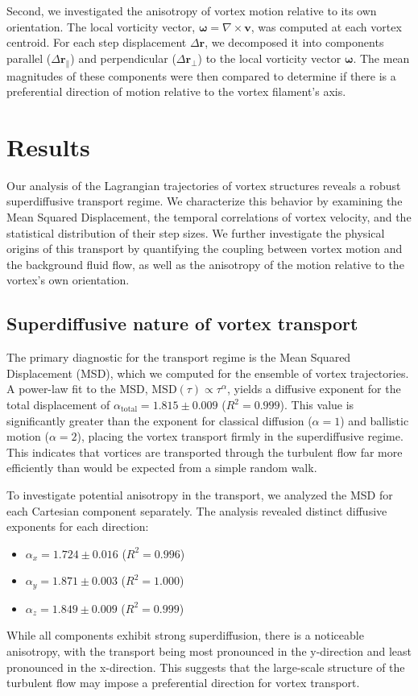 \documentclass[]{article}
\begin{document}
Second, we investigated the anisotropy of vortex motion relative to its own orientation. The local vorticity vector, $\boldsymbol{\omega} = \nabla \times \mathbf{v}$, was computed at each vortex centroid. For each step displacement $\Delta\mathbf{r}$, we decomposed it into components parallel ($\Delta\mathbf{r}_\parallel$) and perpendicular ($\Delta\mathbf{r}_\perp$) to the local vorticity vector $\boldsymbol{\omega}$. The mean magnitudes of these components were then compared to determine if there is a preferential direction of motion relative to the vortex filament's axis.

\section{Results}
\label{sec:results}
Our analysis of the Lagrangian trajectories of vortex structures reveals a robust superdiffusive transport regime. We characterize this behavior by examining the Mean Squared Displacement, the temporal correlations of vortex velocity, and the statistical distribution of their step sizes. We further investigate the physical origins of this transport by quantifying the coupling between vortex motion and the background fluid flow, as well as the anisotropy of the motion relative to the vortex's own orientation.

\subsection{Superdiffusive nature of vortex transport}
The primary diagnostic for the transport regime is the Mean Squared Displacement (MSD), which we computed for the ensemble of vortex trajectories. A power-law fit to the MSD, $\text{MSD}(\tau) \propto \tau^\alpha$, yields a diffusive exponent for the total displacement of $\alpha_{\text{total}} = 1.815 \pm 0.009$ ($R^2 = 0.999$). This value is significantly greater than the exponent for classical diffusion ($\alpha=1$) and ballistic motion ($\alpha=2$), placing the vortex transport firmly in the superdiffusive regime. This indicates that vortices are transported through the turbulent flow far more efficiently than would be expected from a simple random walk.

To investigate potential anisotropy in the transport, we analyzed the MSD for each Cartesian component separately. The analysis revealed distinct diffusive exponents for each direction:
\begin{itemize}
    \item $\alpha_x = 1.724 \pm 0.016$ ($R^2 = 0.996$)
    \item $\alpha_y = 1.871 \pm 0.003$ ($R^2 = 1.000$)
    \item $\alpha_z = 1.849 \pm 0.009$ ($R^2 = 0.999$)
\end{itemize}
While all components exhibit strong superdiffusion, there is a noticeable anisotropy, with the transport being most pronounced in the y-direction and least pronounced in the x-direction. This suggests that the large-scale structure of the turbulent flow may impose a preferential direction for vortex transport.
\end{document}
